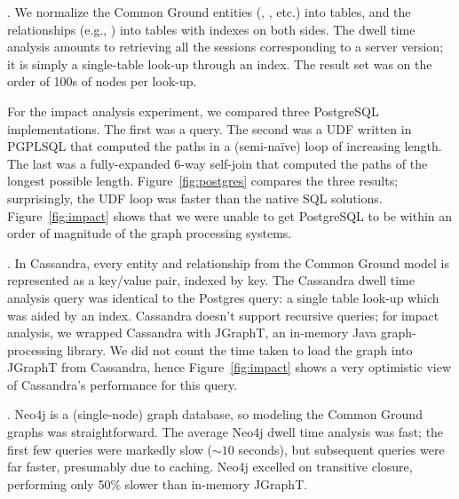 \documentclass{sig-alternate}
\begin{document}
. We normalize the Common Ground entities 
(\thing, \version, etc.) into tables, and the relationships
(e.g., ) into tables with indexes on both sides. 
The dwell time analysis amounts to retrieving all the sessions corresponding to a server version; it is simply a single-table look-up through an index. The result set was on the order of 100s of nodes per look-up.

For the impact analysis experiment, we compared three PostgreSQL implementations. The first was a  query. 
The second was a UDF written in PGPLSQL that computed the paths in a (semi-naïve) loop of increasing length. 
The last was a fully-expanded 6-way self-join that computed the paths of the longest possible length. Figure~\ref{fig:postgres} compares the three results; surprisingly, the UDF loop was faster than the native SQL solutions. 
Figure~\ref{fig:impact} shows that we were unable to get PostgreSQL to be within an order of magnitude of the graph processing systems. 

. In Cassandra, every entity and relationship from the Common Ground model is represented as a key/value pair, indexed by key. 
The Cassandra dwell time analysis query was identical to the Postgres query: a single table look-up which was aided by an index.
Cassandra doesn't support recursive queries; for impact analysis, we wrapped Cassandra with JGraphT, an in-memory Java graph-processing library. We did not count the time taken to load the graph into JGraphT from Cassandra, hence Figure~\ref{fig:impact} shows a very optimistic view of Cassandra's performance for this query.

. Neo4j is a (single-node) graph database, so modeling the Common Ground graphs was straightforward.
The average Neo4j dwell time analysis was fast; the first few queries were markedly slow
(${\sim}10$ seconds),
but subsequent queries were far faster, presumably due to caching. 
Neo4j excelled on transitive closure, performing only 50\% slower than in-memory JGraphT.
\end{document}
